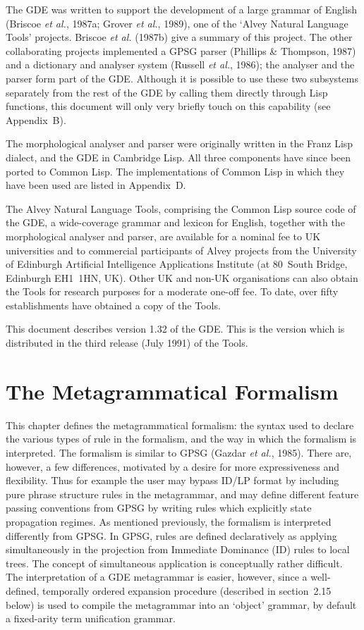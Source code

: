 The GDE was written to support the development of a large grammar of
English (Briscoe {\it et al.}, 1987a; Grover {\it et al.}, 1989),
one of the `Alvey Natural Language Tools' projects.
Briscoe {\it et al.} (1987b) give a summary of this project. The
other collaborating projects implemented a GPSG parser (Phillips \&
Thompson, 1987) and a dictionary and analyser system (Russell {\it et
al.}, 1986); the analyser and the parser form part of the GDE.
Although it is possible to use these two subsystems separately from the
rest of the GDE by calling them directly through Lisp functions, this
document will only very briefly touch on this capability (see Appendix~B).

The morphological analyser and parser were originally written in the Franz
Lisp dialect, and the GDE in Cambridge Lisp. All three components have
since been ported to Common Lisp. The implementations of Common Lisp
in which they have been used are listed in Appendix~D.

The Alvey Natural Language Tools, comprising the Common Lisp source code of
the GDE, a wide-coverage grammar and lexicon for English, together with the
morphological analyser and parser, are available
for a nominal fee to UK universities and to commercial participants of
Alvey projects from the University of Edinburgh Artificial Intelligence
Applications Institute (at 80~South Bridge, Edinburgh EH1~1HN, UK).
Other UK and non-UK organisations can also obtain the Tools for
research purposes for a moderate one-off fee. To date, over fifty
establishments have obtained a copy of the Tools.

This document describes version 1.32 of the GDE. This is the version which
is distributed in the third release (July 1991) of the Tools.


\chapter{The Metagrammatical Formalism}

This chapter defines the metagrammatical formalism: the syntax used to
declare the various types of rule in the formalism, and the way in which
the formalism is interpreted.  The formalism is similar to GPSG (Gazdar
{\it et al.}, 1985). There are, however, a few differences, motivated
by a desire for more expressiveness and flexibility. Thus for example
the user may bypass ID/LP format by including pure phrase structure
rules in the metagrammar, and may define different feature passing
conventions from GPSG by writing rules which explicitly state
propagation regimes.  As mentioned previously, the
formalism is interpreted differently from GPSG. In GPSG, rules are
defined declaratively as applying simultaneously in the projection from
Immediate Dominance (ID) rules to local trees. The concept of
simultaneous application is conceptually rather difficult. The
interpretation of a GDE metagrammar is easier, however, since a
well-defined, temporally ordered expansion procedure (described in
section~2.15 below) is used to compile the metagrammar into an
`object' grammar, by default a fixed-arity term unification grammar.

